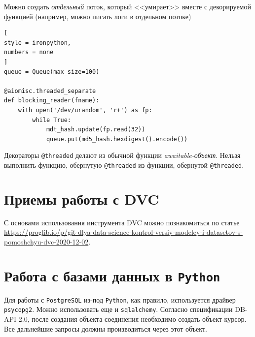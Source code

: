 \documentclass[%
	11pt,
	a4paper,
	utf8,
		]{article}
\begin{document}
Можно создать \emph{отдельный} поток, который <<умирает>> вместе с декорируемой функцией (например, можно писать логи в отдельном потоке)
\begin{lstlisting}[
style = ironpython,
numbers = none
]
queue = Queue(max_size=100)

@aiomisc.threaded_separate
def blocking_reader(fname):
    with open('/dev/urandom', 'r+') as fp:
        while True:
            mdt_hash.update(fp.read(32))
            queue.put(md5_hash.hexdigest().encode())
\end{lstlisting}

Декораторы \verb|@threaded| делают из обычной функции \emph{awaitable-объект}. Нельзя выполнить функцию, обернутую \verb|@threaded| из функции, обернутой \verb|@threaded|.

\section{Приемы работы с DVC}

С основами использования инструмента DVC можно познакомиться по статье \url{https://proglib.io/p/git-dlya-data-science-kontrol-versiy-modeley-i-datasetov-s-pomoshchyu-dvc-2020-12-02}.

\section{Работа с базами данных в \texttt{Python}}

Для работы с \texttt{PostgreSQL} из-под \texttt{Python}, как правило, используется драйвер \texttt{psycopg2}. Можно использовать еще и \texttt{sqlalchemy}. Согласно спецификации DB-API 2.0, после создания объекта соединения необходимо создать объект-курсор. Все дальнейшие запросы должны производиться через этот объект.
\end{document}
